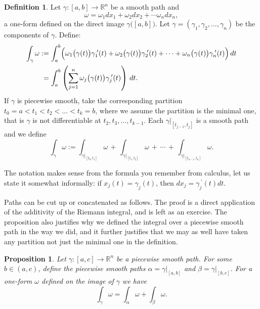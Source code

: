 \documentclass[12pt]{book}
\newcommand{\R}{{\mathbb{R}}}
\theoremstyle{plain}
\newtheorem{prop}[thm]{Proposition}
\theoremstyle{remark}
\theoremstyle{definition}
\newtheorem{defn}[thm]{Definition}
\theoremstyle{exercise}
\theoremstyle{example}
\begin{document}
\begin{defn}
Let $\gamma \colon [a,b] \to \R^n$ be a smooth path
and
\begin{equation*}
\omega = \omega_1 dx_1 + \omega_2 dx_2 + \cdots \omega_n dx_n ,
\end{equation*}
a one-form defined on the direct image $\gamma\bigl([a,b]\bigr)$.
Let $\gamma = (\gamma_1,\gamma_2,\ldots,\gamma_n)$ be the components of
$\gamma$.
Define:
\begin{equation*}
\begin{split}
\int_{\gamma} \omega
& :=
\int_a^b 
\Bigl(
\omega_1\bigl(\gamma(t)\bigr) \gamma_1^{\:\prime}(t) +
\omega_2\bigl(\gamma(t)\bigr) \gamma_2^{\:\prime}(t) + \cdots +
\omega_n\bigl(\gamma(t)\bigr) \gamma_n^{\:\prime}(t) \Bigr) \, dt
\\
&\phantom{:}=
\int_a^b 
\left(
\sum_{j=1}^n
\omega_j\bigl(\gamma(t)\bigr) \gamma_j^{\:\prime}(t) \right) \, dt .
\end{split}
\end{equation*}
If $\gamma$ is piecewise smooth, take the corresponding partition
$t_0 = a < t_1 < t_2 < \ldots < t_k = b$, where we assume the partition is
the minimal one, that is $\gamma$ is not differentiable
at $t_2,t_3,\ldots,t_{k-1}$.  Each $\gamma|_{[t_{j-1},t_j]}$ is
a smooth path and we define
\begin{equation*}
\int_{\gamma} \omega
:=
\int_{\gamma|_{[t_0,t_1]}} \omega
\,
+
\,
\int_{\gamma|_{[t_1,t_2]}} \omega
\,
+ \, \cdots \, + \,
\int_{\gamma|_{[t_{n-1},t_n]}} \omega .
\end{equation*}
\end{defn}

The notation makes sense from the formula you remember from calculus,
let us state it somewhat informally:
if $x_j(t) = \gamma_j(t)$, then $dx_j = \gamma_j^{\:\prime}(t) dt$.

Paths can be cut up or concatenated as follows.  The proof is a direct application
of the additivity of the Riemann integral, and is left as an exercise.
The proposition also justifies why we defined the integral over a piecewise
smooth path in the way we did, and it further justifies that we may as well
have taken any partition not just the minimal one in the definition.

\begin{prop} \label{mv:prop:pathconcat}
Let $\gamma \colon [a,c] \to \R^n$ be a piecewise smooth path.
For some $b \in (a,c)$,
define the piecewise smooth paths
$\alpha = \gamma|_{[a,b]}$ and
$\beta = \gamma|_{[b,c]}$.
For a one-form $\omega$ defined on the image
of $\gamma$ we have
\begin{equation*}
\int_{\gamma} \omega =
\int_{\alpha} \omega +
\int_{\beta} \omega .
\end{equation*}
\end{prop}
\end{document}
